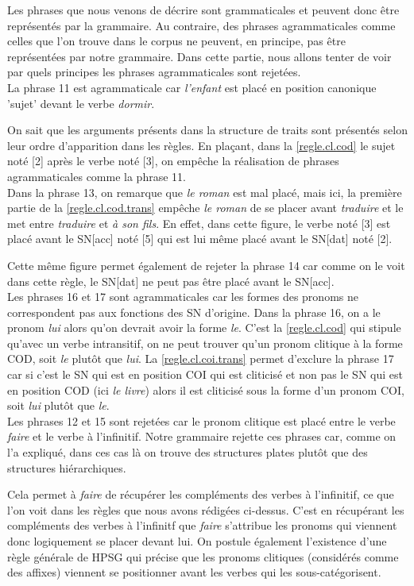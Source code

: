 Les phrases que nous venons de décrire sont grammaticales et peuvent donc être représentés par la grammaire.
Au contraire, des phrases agrammaticales comme celles que l'on trouve dans le corpus ne peuvent, en principe, pas être représentées par notre grammaire.
Dans cette partie, nous allons tenter de voir par quels principes les phrases agrammaticales sont rejetées.\\

La phrase 11 est agrammaticale car \emph{l'enfant} est placé en position canonique 'sujet' devant le verbe \emph{dormir}.

On sait que les arguments présents dans la structure de traits sont présentés selon leur ordre d'apparition dans les règles.
En plaçant, dans la \autoref{regle.cl.cod} le sujet noté [2] après le verbe noté [3], on empêche la réalisation de phrases
agrammaticales comme la phrase 11.\\

Dans la phrase 13, on remarque que \emph{le roman} est mal placé, mais ici, la première partie de la \autoref{regle.cl.cod.trans} empêche \emph{le roman} de se placer avant \emph{traduire} et le met entre \emph{traduire} et \emph{à son fils}.
En effet, dans cette figure, le verbe noté [3] est placé avant le SN[acc] noté [5] qui est lui même placé avant le SN[dat] noté [2].

Cette même figure permet également de rejeter la phrase 14 car comme on le voit dans cette règle, le SN[dat] ne peut pas être placé avant le SN[acc].\\

Les phrases 16 et 17 sont agrammaticales car les formes des pronoms ne correspondent pas aux fonctions des SN d'origine.
Dans la phrase 16, on a le pronom \emph{lui} alors qu'on devrait avoir la forme \emph{le}. C'est la \autoref{regle.cl.cod} qui stipule qu'avec un verbe intransitif, on ne peut trouver qu'un pronom clitique à la forme COD, soit \emph{le} plutôt que \emph{lui}.
La \autoref{regle.cl.coi.trans} permet d'exclure la phrase 17 car si c'est le SN qui est en position COI qui est cliticisé et non pas le SN qui est en position COD (ici \emph{le livre}) alors il est cliticisé sous la forme d'un pronom COI, soit \emph{lui} plutôt que \emph{le}.\\

Les phrases 12 et 15 sont rejetées car le pronom clitique est placé entre le verbe \emph{faire} et le verbe à l'infinitif.
Notre grammaire rejette ces phrases car, comme on l'a expliqué, dans ces cas là on trouve des structures plates plutôt que des
structures hiérarchiques.

Cela permet à \emph{faire} de récupérer les compléments des verbes à l'infinitif, ce que l'on voit dans les règles que nous avons rédigées ci-dessus.
C'est en récupérant les compléments des verbes à l'infinitf que \emph{faire} s'attribue les pronoms qui viennent donc logiquement se placer devant lui.
On postule également l'existence d'une règle générale de HPSG qui précise que les pronoms clitiques (considérés comme des affixes) viennent se positionner avant les verbes qui les sous-catégorisent.
